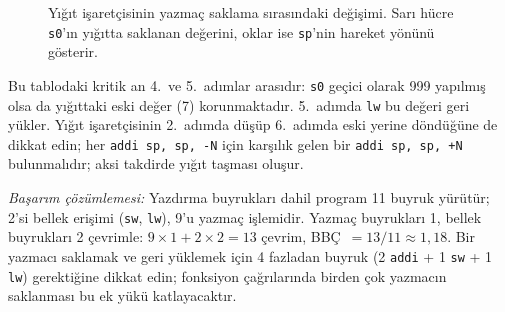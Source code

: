 \begin{ornek}[4.3]
\begin{figure}[H]
\centering
{}
\caption[Yığıt işaretçisinin yazmaç saklama sırasındaki değişimi]{Yığıt işaretçisinin yazmaç saklama sırasındaki değişimi. Sarı hücre \texttt{s0}'ın yığıtta saklanan değerini, oklar ise \texttt{sp}'nin hareket yönünü gösterir.}
\label{fig:yigit-buyume}
\end{figure}

Bu tablodaki kritik an 4.~ve 5.~adımlar arasıdır: \texttt{s0} geçici olarak 999 yapılmış olsa da yığıttaki eski değer (7) korunmaktadır. 5.~adımda \texttt{lw} bu değeri geri yükler. Yığıt işaretçisinin 2.~adımda düşüp 6.~adımda eski yerine döndüğüne de dikkat edin; her \texttt{addi sp, sp, -N} için karşılık gelen bir \texttt{addi sp, sp, +N} bulunmalıdır; aksi takdirde yığıt taşması oluşur.

\emph{Başarım çözümlemesi:} Yazdırma buyrukları dahil program 11 buyruk yürütür; 2'si bellek erişimi (\texttt{sw}, \texttt{lw}), 9'u yazmaç işlemidir. Yazmaç buyrukları 1, bellek buyrukları 2 çevrimle: $9 \times 1 + 2 \times 2 = 13$ çevrim, BBÇ~$= 13/11 \approx 1{,}18$. Bir yazmacı saklamak ve geri yüklemek için 4 fazladan buyruk (2 \texttt{addi} + 1 \texttt{sw} + 1 \texttt{lw}) gerektiğine dikkat edin; fonksiyon çağrılarında birden çok yazmacın saklanması bu ek yükü katlayacaktır.
\end{ornek}

